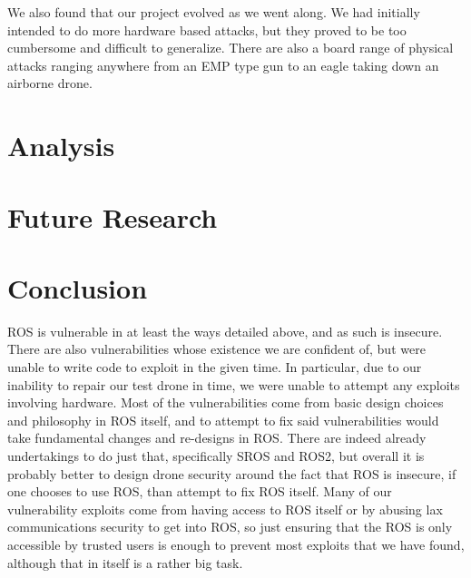\documentclass[IEEEtran,letterpaper,10pt,notitlepage,draftclsnofoot,onecolumn]{article}
\begin{document}
We also found that our project evolved as we went along.
We had initially intended to do more hardware based attacks, but they proved to be too cumbersome and difficult to generalize.
There are also a board range of physical attacks ranging anywhere from an EMP type gun to an eagle taking down an airborne drone.

\section{Analysis}

\section{Future Research}


\section{Conclusion}
ROS is vulnerable in at least the ways detailed above, and as such is insecure.
There are also vulnerabilities whose existence we are confident of, but were unable to write code to exploit in the given time.
In particular, due to our inability to repair our test drone in time, we were unable to attempt any exploits involving hardware.
Most of the vulnerabilities come from basic design choices and philosophy in ROS itself, and to attempt to fix said vulnerabilities would take fundamental changes and re-designs in ROS.
There are indeed already undertakings to do just that, specifically SROS and ROS2, but overall it is probably better to design drone security around the fact that ROS is insecure, if one chooses to use ROS, than attempt to fix ROS itself.
Many of our vulnerability exploits come from having access to ROS itself or by abusing lax communications security to get into ROS, so just ensuring that the ROS is only accessible by trusted users is enough to prevent most exploits that we have found, although that in itself is a rather big task.



\end{document}
